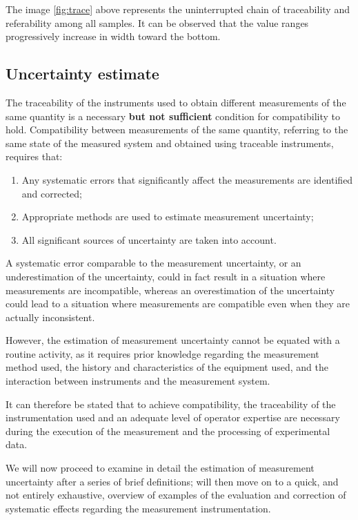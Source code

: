 \documentclass[../main.tex]{subfiles}
\begin{document}
The image \ref{fig:trace} above represents the uninterrupted chain of traceability and referability among all samples. It can be observed that the value ranges progressively increase in width toward the bottom.\\

\subsection{Uncertainty estimate} %

The traceability of the instruments used to obtain different measurements of the same quantity is a necessary \textbf{but not sufficient} condition for compatibility to hold. Compatibility between measurements of the same quantity, referring to the same state of the measured system and obtained using traceable instruments, requires that:

\begin{enumerate}
	\item[\textbf{-}] Any systematic errors that significantly affect the measurements are identified and corrected;
	\item[\textbf{-}] Appropriate methods are used to estimate measurement uncertainty;
	\item[\textbf{-}] All significant sources of uncertainty are taken into account.
	  
\end{enumerate}

A systematic error comparable to the measurement uncertainty, or an underestimation of the uncertainty, could in fact result in a situation where measurements are incompatible, whereas an overestimation of the uncertainty could lead to a situation where measurements are compatible even when they are actually inconsistent.

However, the estimation of measurement uncertainty cannot be equated with a routine activity, as it requires prior knowledge regarding the measurement method used, the history and characteristics of the equipment used, and the interaction between instruments and the measurement system. 

It can therefore be stated that to achieve compatibility, the traceability of the instrumentation used and an adequate level of operator expertise are necessary during the execution of the measurement and the processing of experimental data.

We will now proceed to examine in detail the estimation of measurement uncertainty after a series of brief definitions; will then move on to a quick, and not entirely exhaustive, overview of examples of the evaluation and correction of systematic effects regarding the measurement instrumentation.
\end{document}
